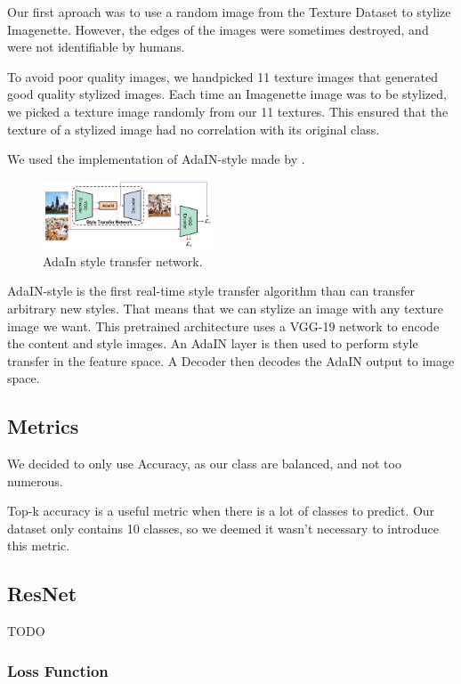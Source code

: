 \documentclass{article}
\begin{document}
\noindent
Our first aproach was to use a random image from the Texture Dataset to stylize Imagenette. However, 
the edges of the images were sometimes destroyed, and were not identifiable by humans. \smallskip

\noindent
To avoid poor quality images, we handpicked 11 texture images that generated good quality stylized images.
Each time an Imagenette image was to be stylized, we picked a texture image randomly from our 11 textures.
This ensured that the texture of a stylized image had no correlation with its original class. \smallskip

\noindent
We used the implementation of AdaIN-style \cite{huang2017arbitrary} made by \cite{stylizeddatasets2019}.
\begin{figure}[h!]\center
  \includegraphics[width=0.45\textwidth]{imgs/adain_architecture}
  \caption{AdaIn style transfer network.}
\end{figure}

AdaIN-style is the first real-time style transfer algorithm than can transfer arbitrary new styles.
That means that we can stylize an image with any texture image we want.
This pretrained architecture uses a VGG-19 network to encode the content and style images.
An AdaIN layer is then used to perform style transfer in the feature space.   
A Decoder then decodes the AdaIN output to image space.

\subsection{Metrics}

We decided to only use Accuracy, as our class are balanced, and not too numerous.

Top-k accuracy is a useful metric when there is a lot of classes to predict. Our dataset only
contains 10 classes, so we deemed it wasn't necessary to introduce this metric.

\subsection{ResNet}

TODO

\subsubsection{Loss Function}
\end{document}
